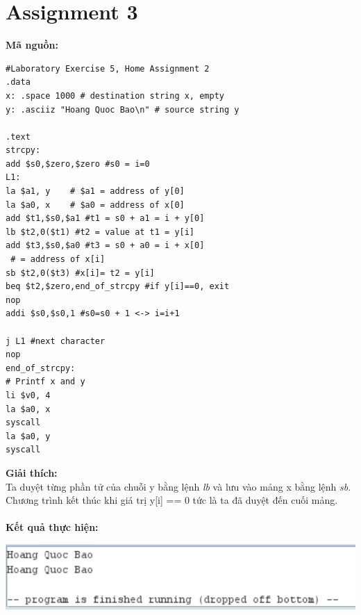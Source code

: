 \documentclass[12pt,a4paper,oneside]{article}
\begin{document}
\section*{Assignment 3}
\textbf{Mã nguồn:}
\begin{lstlisting}
#Laboratory Exercise 5, Home Assignment 2
.data
x: .space 1000 # destination string x, empty
y: .asciiz "Hoang Quoc Bao\n" # source string y

.text
strcpy:
add $s0,$zero,$zero #s0 = i=0
L1:
la $a1, y	 # $a1 = address of y[0]
la $a0, x	 # $a0 = address of x[0]
add $t1,$s0,$a1 #t1 = s0 + a1 = i + y[0]
lb $t2,0($t1) #t2 = value at t1 = y[i]
add $t3,$s0,$a0 #t3 = s0 + a0 = i + x[0] 
 # = address of x[i]
sb $t2,0($t3) #x[i]= t2 = y[i]
beq $t2,$zero,end_of_strcpy #if y[i]==0, exit
nop
addi $s0,$s0,1 #s0=s0 + 1 <-> i=i+1

j L1 #next character
nop
end_of_strcpy:
# Printf x and y
li $v0, 4
la $a0, x
syscall
la $a0, y
syscall
\end{lstlisting}
\textbf{Giải thích: }\\
Ta duyệt từng phần tử của chuỗi y bằng lệnh \textit{lb} và lưu vào mảng x bằng lệnh \textit{sb}. Chương trình kết thúc khi giá trị y[i] == 0 tức là ta đã duyệt đến cuối mảng.\\
\\\textbf{Kết quả thực hiện:}
\begin{center}
\includegraphics[scale=1]{3}
\end{center}
\pagebreak
\end{document}
